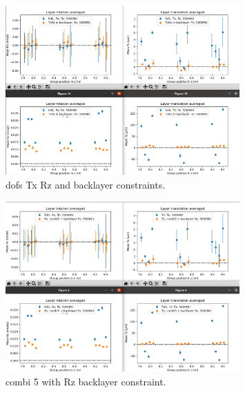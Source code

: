 
\begin{figure}
  \centering
  \includegraphics[width=0.8\textwidth]{plots/oct_4/TxRz_config5_backlayer.png}
  \caption{dofs Tx Rz and backlayer constraints.}
  \label{fig:oct4}
\end{figure}

\begin{figure}
  \centering
  \includegraphics[width=0.8\textwidth]{plots/oct_6/combi5_added_RZ_backlayer.png}
  \caption{combi 5 with Rz backlayer constraint.}
  \label{fig:oct6}
\end{figure}


